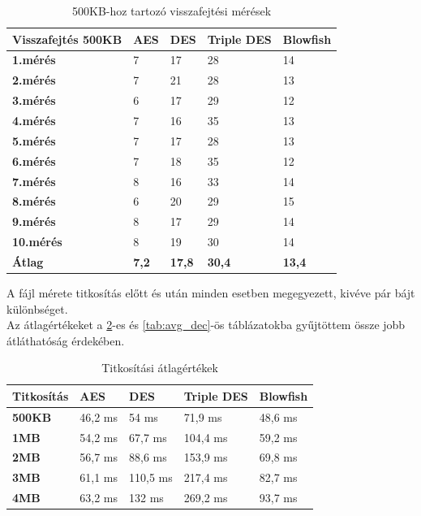 \begin{table}[H]
	\centering
	\caption{500KB-hoz tartozó visszafejtési mérések}
	\label{tab:dec_500kb}
	\medskip
	\begin{tabular}{|p{2.4cm}|p{2cm}|p{2cm}|p{2cm}|p{2cm}|}
		\hline
		\textbf{Visszafejtés} \newline \textbf{500KB} & \textbf{AES} & \textbf{DES} & \textbf{Triple DES} & \textbf{Blowfish}\\
		\hline
		\textbf{1.mérés} & 7 & 17 & 28 & 14\\
		\hline
		\textbf{2.mérés} & 7 & 21 & 28 & 13\\
		\hline
		\textbf{3.mérés} & 6 & 17 & 29 & 12\\
		\hline
		\textbf{4.mérés} & 7 & 16 & 35 & 13\\
		\hline
		\textbf{5.mérés} & 7 & 17 & 28 & 13\\
		\hline
		\textbf{6.mérés} & 7 & 18 & 35 & 12\\
		\hline
		\textbf{7.mérés} & 8 & 16 & 33 & 14\\
		\hline
		\textbf{8.mérés} & 6 & 20 & 29 & 15\\
		\hline
		\textbf{9.mérés} & 8 & 17 & 29 & 14\\
		\hline
		\textbf{10.mérés} & 8 & 19 & 30 & 14\\
		\hline
		\hline
		\textbf{Átlag} & \textbf{7,2} & \textbf{17,8} & \textbf{30,4} & \textbf{13,4}\\
		\hline
	\end{tabular}
\end{table}


\noindent A fájl mérete titkosítás előtt és után minden esetben megegyezett, kivéve pár bájt különbséget.
\vspace{5pt} \\Az átlagértékeket a \ref{tab:avg_enc}-es és \ref{tab:avg_dec}-ös táblázatokba gyűjtöttem össze jobb átláthatóság érdekében.
\begin{table}[H]
	\centering
	\caption{Titkosítási átlagértékek}
	\label{tab:avg_enc}
	\medskip
	\begin{tabular}{|p{2.4cm}|p{2.7cm}|p{2.7cm}|p{2.7cm}|p{2.7cm}|}
		\hline
		\textbf{Titkosítás}& \textbf{AES} & \textbf{DES} & \textbf{Triple DES}  & \textbf{Blowfish} \\
		\hline
		\textbf{500KB}&46,2 ms&54 ms&71,9 ms&48,6 ms \\
		\hline
		\textbf{1MB}&54,2 ms&67,7 ms&104,4 ms&59,2 ms \\
		\hline
		\textbf{2MB}&56,7 ms&88,6 ms&153,9 ms&69,8 ms \\
		\hline
		\textbf{3MB}&61,1 ms&110,5 ms&217,4 ms&82,7 ms \\
		\hline
		\textbf{4MB}&63,2 ms&132 ms&269,2 ms&93,7 ms \\
		\hline
	\end{tabular}
\end{table}


